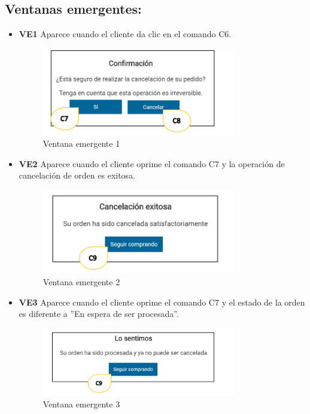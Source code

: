 \documentclass[oneside,10pt]{book}
\begin{document}
\subsection{Ventanas emergentes:}
\begin{itemize}
\item \textbf{VE1} Aparece cuando el cliente da clic en el comando C6.
\begin{figure}[htbp!]
		\centering
			\includegraphics[width=0.8\textwidth]{images/3}
		\caption{Ventana emergente 1}
	\end{figure}
\end{itemize}


\begin{itemize}
\item \textbf{VE2} Aparece cuando el cliente oprime el comando C7 y la operación de cancelación de orden es exitosa.
\begin{figure}[htbp!]
		\centering
			\includegraphics[width=0.8\textwidth]{images/4}
		\caption{Ventana emergente 2}
	\end{figure}
\end{itemize}
\newpage
\begin{itemize}
\item \textbf{VE3} Aparece cuando el cliente oprime el comando C7 y el estado de la orden es diferente a ''En espera de ser procesada''.
\begin{figure}[htbp!]
		\centering
			\includegraphics[width=0.8\textwidth]{images/5}
		\caption{Ventana emergente 3}
	\end{figure}
\end{itemize}
\end{document}
